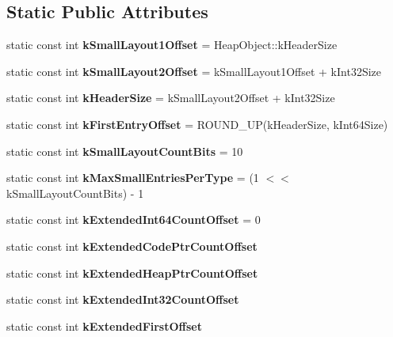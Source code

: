 \subsection*{Static Public Attributes}
\begin{DoxyCompactItemize}
\item 
\hypertarget{classv8_1_1internal_1_1_constant_pool_array_aaadcbe2fd2e2130321d4bc4dfa47c873}{}static const int {\bfseries k\+Small\+Layout1\+Offset} = Heap\+Object\+::k\+Header\+Size\label{classv8_1_1internal_1_1_constant_pool_array_aaadcbe2fd2e2130321d4bc4dfa47c873}

\item 
\hypertarget{classv8_1_1internal_1_1_constant_pool_array_abea0f84484951106772bc0776de3e9fd}{}static const int {\bfseries k\+Small\+Layout2\+Offset} = k\+Small\+Layout1\+Offset + k\+Int32\+Size\label{classv8_1_1internal_1_1_constant_pool_array_abea0f84484951106772bc0776de3e9fd}

\item 
\hypertarget{classv8_1_1internal_1_1_constant_pool_array_a6d47c1a4fee3892d09d7adfdf50a2369}{}static const int {\bfseries k\+Header\+Size} = k\+Small\+Layout2\+Offset + k\+Int32\+Size\label{classv8_1_1internal_1_1_constant_pool_array_a6d47c1a4fee3892d09d7adfdf50a2369}

\item 
\hypertarget{classv8_1_1internal_1_1_constant_pool_array_a3846c6ff07244f8fe64a531dcaa7b5a0}{}static const int {\bfseries k\+First\+Entry\+Offset} = R\+O\+U\+N\+D\+\_\+\+U\+P(k\+Header\+Size, k\+Int64\+Size)\label{classv8_1_1internal_1_1_constant_pool_array_a3846c6ff07244f8fe64a531dcaa7b5a0}

\item 
\hypertarget{classv8_1_1internal_1_1_constant_pool_array_a04366d12cfc107120e57fca85c1d175f}{}static const int {\bfseries k\+Small\+Layout\+Count\+Bits} = 10\label{classv8_1_1internal_1_1_constant_pool_array_a04366d12cfc107120e57fca85c1d175f}

\item 
\hypertarget{classv8_1_1internal_1_1_constant_pool_array_aa2c9713d2df86c747f4652671f2cd4f9}{}static const int {\bfseries k\+Max\+Small\+Entries\+Per\+Type} = (1 $<$$<$ k\+Small\+Layout\+Count\+Bits) -\/ 1\label{classv8_1_1internal_1_1_constant_pool_array_aa2c9713d2df86c747f4652671f2cd4f9}

\item 
\hypertarget{classv8_1_1internal_1_1_constant_pool_array_a5943a336c420c881321f2df98c2d5af6}{}static const int {\bfseries k\+Extended\+Int64\+Count\+Offset} = 0\label{classv8_1_1internal_1_1_constant_pool_array_a5943a336c420c881321f2df98c2d5af6}

\item 
static const int {\bfseries k\+Extended\+Code\+Ptr\+Count\+Offset}
\item 
static const int {\bfseries k\+Extended\+Heap\+Ptr\+Count\+Offset}
\item 
static const int {\bfseries k\+Extended\+Int32\+Count\+Offset}
\item 
static const int {\bfseries k\+Extended\+First\+Offset}
\end{DoxyCompactItemize}
